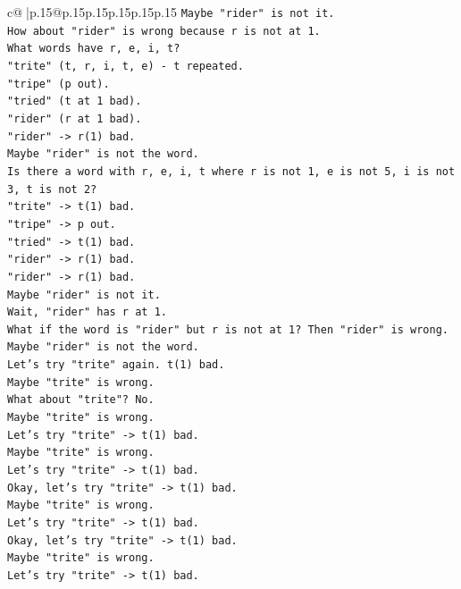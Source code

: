 \documentclass{article}
\begin{document}
{\begin{supertabular}{c@{$\;$}|p{.15\linewidth}@{}p{.15\linewidth}p{.15\linewidth}p{.15\linewidth}p{.15\linewidth}p{.15\linewidth}}
{{{\texttt{Maybe "rider" is not it.} \\
\texttt{How about "rider" is wrong because r is not at 1.} \\
\texttt{What words have r, e, i, t?} \\
\texttt{"trite" (t, r, i, t, e) {-} t repeated.} \\
\texttt{"tripe" (p out).} \\
\texttt{"tried" (t at 1 bad).} \\
\texttt{"rider" (r at 1 bad).} \\
\texttt{"rider" {-}> r(1) bad.} \\
\texttt{Maybe "rider" is not the word.} \\
\texttt{Is there a word with r, e, i, t where r is not 1, e is not 5, i is not 3, t is not 2?} \\
\texttt{"trite" {-}> t(1) bad.} \\
\texttt{"tripe" {-}> p out.} \\
\texttt{"tried" {-}> t(1) bad.} \\
\texttt{"rider" {-}> r(1) bad.} \\
\texttt{"rider" {-}> r(1) bad.} \\
\texttt{Maybe "rider" is not it.} \\
\texttt{Wait, "rider" has r at 1.} \\
\texttt{What if the word is "rider" but r is not at 1? Then "rider" is wrong.} \\
\texttt{Maybe "rider" is not the word.} \\
\texttt{Let's try "trite" again. t(1) bad.} \\
\texttt{Maybe "trite" is wrong.} \\
\texttt{What about "trite"? No.} \\
\texttt{Maybe "trite" is wrong.} \\
\texttt{Let's try "trite" {-}> t(1) bad.} \\
\texttt{Maybe "trite" is wrong.} \\
\texttt{Let's try "trite" {-}> t(1) bad.} \\
\texttt{Okay, let's try "trite" {-}> t(1) bad.} \\
\texttt{Maybe "trite" is wrong.} \\
\texttt{Let's try "trite" {-}> t(1) bad.} \\
\texttt{Okay, let's try "trite" {-}> t(1) bad.} \\
\texttt{Maybe "trite" is wrong.} \\
\texttt{Let's try "trite" {-}> t(1) bad.} \\
}}}
\end{supertabular}}
\end{document}
